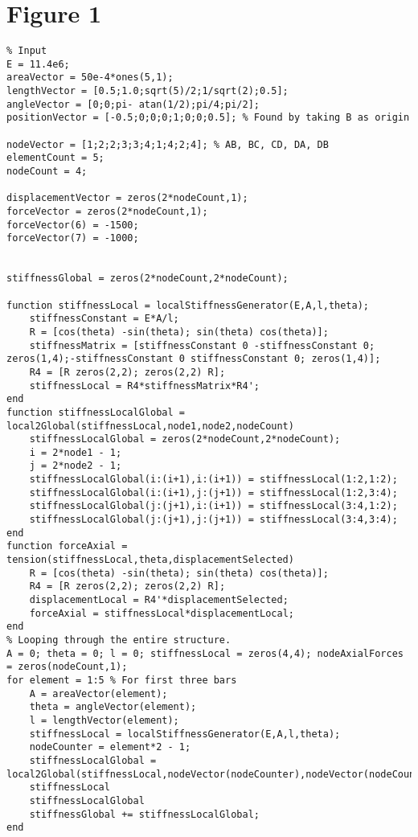 \documentclass{article}
\begin{document}
\section{Figure 1} 
\begin{verbatim}
% Input
E = 11.4e6;
areaVector = 50e-4*ones(5,1);
lengthVector = [0.5;1.0;sqrt(5)/2;1/sqrt(2);0.5];
angleVector = [0;0;pi- atan(1/2);pi/4;pi/2];
positionVector = [-0.5;0;0;0;1;0;0;0.5]; % Found by taking B as origin

nodeVector = [1;2;2;3;3;4;1;4;2;4]; % AB, BC, CD, DA, DB
elementCount = 5;
nodeCount = 4;

displacementVector = zeros(2*nodeCount,1);
forceVector = zeros(2*nodeCount,1);
forceVector(6) = -1500;
forceVector(7) = -1000;


stiffnessGlobal = zeros(2*nodeCount,2*nodeCount);

function stiffnessLocal = localStiffnessGenerator(E,A,l,theta);
    stiffnessConstant = E*A/l;
    R = [cos(theta) -sin(theta); sin(theta) cos(theta)];
    stiffnessMatrix = [stiffnessConstant 0 -stiffnessConstant 0; zeros(1,4);-stiffnessConstant 0 stiffnessConstant 0; zeros(1,4)];
    R4 = [R zeros(2,2); zeros(2,2) R];
    stiffnessLocal = R4*stiffnessMatrix*R4';
end
function stiffnessLocalGlobal = local2Global(stiffnessLocal,node1,node2,nodeCount)
    stiffnessLocalGlobal = zeros(2*nodeCount,2*nodeCount);
    i = 2*node1 - 1;
    j = 2*node2 - 1;
    stiffnessLocalGlobal(i:(i+1),i:(i+1)) = stiffnessLocal(1:2,1:2);
    stiffnessLocalGlobal(i:(i+1),j:(j+1)) = stiffnessLocal(1:2,3:4);
    stiffnessLocalGlobal(j:(j+1),i:(i+1)) = stiffnessLocal(3:4,1:2);
    stiffnessLocalGlobal(j:(j+1),j:(j+1)) = stiffnessLocal(3:4,3:4);
end
function forceAxial = tension(stiffnessLocal,theta,displacementSelected)
    R = [cos(theta) -sin(theta); sin(theta) cos(theta)];
    R4 = [R zeros(2,2); zeros(2,2) R];
    displacementLocal = R4'*displacementSelected;
    forceAxial = stiffnessLocal*displacementLocal;
end
% Looping through the entire structure.
A = 0; theta = 0; l = 0; stiffnessLocal = zeros(4,4); nodeAxialForces = zeros(nodeCount,1);
for element = 1:5 % For first three bars
    A = areaVector(element);
    theta = angleVector(element);
    l = lengthVector(element);
    stiffnessLocal = localStiffnessGenerator(E,A,l,theta);
    nodeCounter = element*2 - 1;
    stiffnessLocalGlobal = local2Global(stiffnessLocal,nodeVector(nodeCounter),nodeVector(nodeCounter+1),nodeCount);
    stiffnessLocal
    stiffnessLocalGlobal
    stiffnessGlobal += stiffnessLocalGlobal;
end


\end{verbatim}
\end{document}
